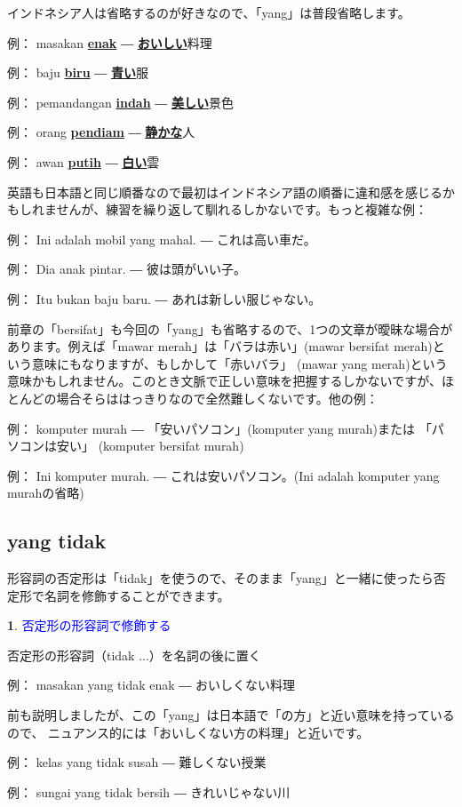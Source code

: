 \documentclass[uplatex]{jsarticle}
\theoremstyle{definition}
\newtheorem*{grammarpoint*}{}
\newcommand{\grammarpoint}[1]{
\begin{grammarpoint*}
  \textcolor{blue}{#1}
\end{grammarpoint*}
}
\newcommand{\example}[2]{
例： #1 ― #2
}
\newcommand{\bu}[1]{\underline{\textbf{#1}}}
\newcommand{\bi}[1]{\bu{#1}}
\newcommand{\bj}[1]{\bu{#1}}
\begin{document}
インドネシア人は省略するのが好きなので、「yang」は普段省略します。

\example{masakan \bi{enak}}{\bj{おいしい}料理}

\example{baju \bi{biru}}{\bj{青い}服}

\example{pemandangan \bi{indah}}{\bj{美しい}景色}

\example{orang \bi{pendiam}}{\bj{静かな}人}

\example{awan \bi{putih}}{\bj{白い}雲}

英語も日本語と同じ順番なので最初はインドネシア語の順番に違和感を感じるかもしれませんが、練習を繰り返して馴れるしかないです。もっと複雑な例：

\example{Ini adalah mobil yang mahal.}{これは高い車だ。}

\example{Dia anak pintar.}{彼は頭がいい子。}

\example{Itu bukan baju baru.}{あれは新しい服じゃない。}

前章の「bersifat」も今回の「yang」も省略するので、1つの文章が曖昧な場合があります。例えば「mawar
merah」は「バラは赤い」(mawar bersifat merah)という意味にもなりますが、もしかして「赤いバラ」
(mawar yang merah)という意味かもしれません。このとき文脈で正しい意味を把握するしかないですが、ほとんどの場合そらははっきりなので全然難しくないです。他の例：

\example{komputer murah}{「安いパソコン」(komputer yang murah)または
「パソコンは安い」 (komputer bersifat murah)}

\example{Ini komputer murah.}{これは安いパソコン。(Ini adalah komputer yang murahの省略)}

\subsection*{yang tidak}

形容詞の否定形は「tidak」を使うので、そのまま「yang」と一緒に使ったら否定形で名詞を修飾することができます。

\grammarpoint{否定形の形容詞で修飾する}

否定形の形容詞（tidak ...）を名詞の後に置く

\example{masakan yang tidak enak}{おいしくない料理}

前も説明しましたが、この「yang」は日本語で「の方」と近い意味を持っているので、
ニュアンス的には「おいしくない方の料理」と近いです。

\example{kelas yang tidak susah}{難しくない授業}

\example{sungai yang tidak bersih}{きれいじゃない川}
\end{document}
